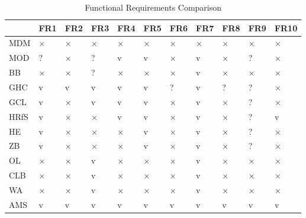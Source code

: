 \begin{table}[H]
    \centering
    \bgroup
    \def\arraystretch{1.5}
    \begin{tabular}{|l|l|l|l|l|l|l|l|l|l|l|}
    \hline
         & FR1 & FR2 & FR3 & FR4 & FR5 & FR6 & FR7 & FR8 & FR9 & FR10 \\ \hline
        MDM & × & × & × & × & × & × & × & × & × & × \\ \hline
        MOD & ? & × & ? & v & v & × & v & × & ? & × \\ \hline
        BB & × & × & ? & × & × & × & v & × & × & × \\ \hline
        GHC & v & v & v & v & v & ? & v & ? & ? & × \\ \hline
        GCL & v & × & v & v & v & × & v & × & ? & × \\ \hline
        HRfS & v & × & × & v & v & × & v & × & ? & v \\ \hline
        HE & v & × & × & × & v & × & v & × & ? & × \\ \hline
        ZB & v & × & × & × & v & × & v & × & ? & × \\ \hline
        OL & × & × & v & × & × & × & v & × & × & × \\ \hline
        CLB & × & × & v & × & × & × & v & × & × & × \\ \hline
        WA & × & × & v & × & × & × & v & × & × & × \\ \hline
        AMS & v & v & v & v & v & v & v & v & v & v \\ \hline
    \end{tabular}
    \egroup
    \caption{Functional Requirements Comparison}
\end{table}
